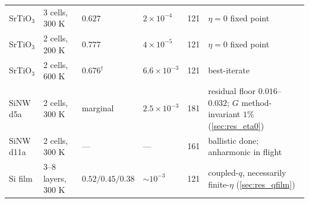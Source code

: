 \begin{table}[htb]
\begin{tabular}{llllll}
    SrTiO$_3$ & 3 cells, 300 K & $0.627$ & $2\times10^{-4}$ & 121 & $\eta=0$ fixed point \\
    SrTiO$_3$ & 2 cells, 200 K & $0.777$ & $4\times10^{-5}$ & 121 & $\eta=0$ fixed point \\
    SrTiO$_3$ & 2 cells, 600 K & $0.676^\dagger$ & $6.6\times10^{-3}$ & 121 & best-iterate \\
    SiNW d5a & 2 cells, 300 K & marginal & $2.5\times10^{-3}$ & 181 & residual floor $0.016$--$0.032$; $G$ method-invariant $1\%$ (\cref{sec:res_eta0}) \\
    SiNW d11a & 2 cells, 300 K & --- & --- & 161 & ballistic done; anharmonic in flight \\
    Si film & 3--8 layers, 300 K & $0.52/0.45/0.38$ & $\sim10^{-3}$ & 121 & coupled-$q$, necessarily finite-$\eta$ (\cref{sec:res_qfilm}) \\
    \hline
  \end{tabular}
\end{table}
